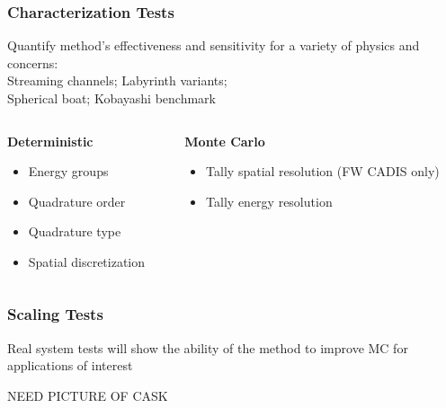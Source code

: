 \documentclass[handout]{beamer}
\renewcommand{\(}{\begin{columns}}
\renewcommand{\)}{\end{columns}}
\newcommand{\<}[1]{\begin{column}{#1}}
\renewcommand{\>}{\end{column}}
\begin{document}
\begin{frame}[fragile]

  \frametitle{Characterization Tests}
   Quantify method's effectiveness and sensitivity for a variety of physics and concerns: \\
   \vspace*{.5 em}
    Streaming channels; \hspace*{2 em} Labyrinth variants;\\
    Spherical boat; \hspace*{4.25 em} Kobayashi benchmark
    \vspace{1 em}
    
    \begin{columns}
    \begin{column}{0.45\textwidth}
    \textbf{Deterministic}
    \begin{itemize}
    \item Energy groups 
    \item Quadrature order
    \item Quadrature type
    \item Spatial discretization
    \end{itemize}
    \end{column}
    
    \begin{column}{0.55\textwidth}
    \textbf{Monte Carlo}
    \begin{itemize}
    \item Tally spatial resolution (FW CADIS only)
    \item Tally energy resolution 
    \end{itemize}
    \end{column}
  \end{columns}

\end{frame}


\begin{frame}[fragile]

  \frametitle{Scaling Tests}
  
  Real system tests will show the ability of the method to improve MC for applications of interest
  \vspace*{1 em}

NEED PICTURE OF CASK  

\end{frame}
\end{document}
